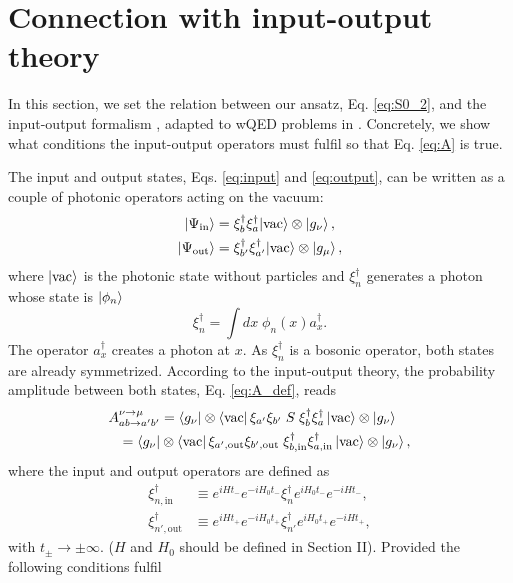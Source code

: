 \documentclass[aps,pra,reprint,amsmath,amssymb]{revtex4-1}
\begin{document}
\section{Connection with input-output theory}\label{sec:inout}

In this section, we set the relation between our ansatz, Eq. \eqref{eq:S0_2}, and the input-output formalism \cite{Gardiner1985}, adapted to wQED problems in \cite{Fan2010}. Concretely, we show what conditions the input-output operators must fulfil so that Eq. \eqref{eq:A} is true.

The input and output states, Eqs. \eqref{eq:input} and \eqref{eq:output}, can be written as a couple of photonic operators acting on the vacuum:
\begin{align}
\label{eq:input_inout}|\Psi_\text{in}\rangle & = \xi_b^\dagger \xi_a^\dagger|\text{vac}\rangle \otimes \ket{g_\nu},\\
\label{eq:output_inout}|\Psi_\text{out}\rangle & = \xi_{b'}^\dagger \xi_{a'}^\dagger|\text{vac}\rangle \otimes \ket{g_\mu},
\end{align}
where $\ket{\text{vac}}$ is the photonic state without particles and $\xi_n^\dagger$ generates a photon whose state is $\ket{\phi_n}$
\begin{equation}
\xi_n^\dagger = \int dx\; \phi_n(x) a_x^\dagger.
\end{equation}
The operator $a_x^\dagger$ creates a photon at $x$. As $\xi_n^\dagger$ is a bosonic operator, both states are already symmetrized. According to the input-output theory, the probability amplitude between both states, Eq. \eqref{eq:A_def}, reads \cite{Fan2010}
\begin{align}\label{eq:A_inout}
A_{ab\to a'b'}^{\nu\to\mu}&=\bra{g_\nu}\otimes\bra{\text{vac}}\xi_{a'}\xi_{b'}\;S\;\xi_b^\dagger\xi_a^\dagger
\ket{\text{vac}}\otimes\ket{g_\nu}\nonumber\\
=\bra{g_\nu}&\otimes\bra{\text{vac}}\xi_{a',\text{out}}\xi_{b',\text{out}}\;\xi_{b,\text{in}}^\dagger\xi_{a,\text{in}}^\dagger
\ket{\text{vac}}\otimes\ket{g_\nu},
\end{align}
where the input and output operators are defined as
\begin{align}
\xi_{n,\text{in}}^\dagger & \equiv e^{iHt_-} e^{-iH_0t_-}\xi_n^\dagger e^{iH_0 t_-} e^{-iHt_-},\\
\xi_{n',\text{out}}^\dagger & \equiv e^{iHt_+} e^{-iH_0t_+}\xi_{n'}^\dagger e^{iH_0 t_+} e^{-iHt_+},
\end{align}
with $t_\pm \to\pm\infty$. {\color{blue}($H$ and $H_0$ should be defined in Section II)}. Provided the following conditions fulfil
\end{document}
